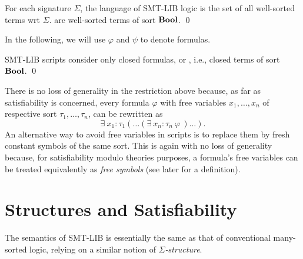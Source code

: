\begin{definition}
For each signature $\Sigma$,
the language of SMT-LIB logic is the set of all well-sorted terms
wrt $\Sigma$.
 are well-sorted terms of sort $\textbf{Bool}$.
\qed
\end{definition}

In the following, we will use $\varphi$ and $\psi$ to denote formulas.
\medskip

\begin{constraint}
SMT-LIB scripts consider only closed formulas,
or , i.e., closed terms of sort $\textbf{Bool}$.
\qed
\end{constraint}

There is no loss of generality in the restriction above because,
as far as satisfiability is concerned,
every formula $\varphi$ with free variables 
$x_1, \ldots, x_n$ of respective sort $\tau_1, \ldots, \tau_n$,
can be rewritten as 
\[
 \exists\: x_1{:}\tau_1 ( \ldots (\exists\:x_n{:}\tau_n\: \varphi\ )\ldots).
\]
An alternative way to avoid free variables in scripts is 
to replace them by fresh constant symbols of the same sort.
This is again with no loss of generality because,
for satisfiability modulo theories purposes,
a formula's free variables can be treated equivalently as 
\emph{free symbols} (see later for a definition).


\section{Structures and Satisfiability} \label{sec:models}

The semantics of SMT-LIB is essentially the same as that 
of conventional many-sorted logic,
relying on a similar notion of \emph{$\Sigma$-structure}.

